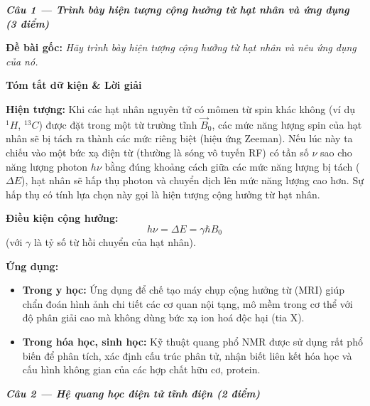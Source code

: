 \documentclass[11pt,a4paper,twocolumn]{article}
\begin{document}

\textbf{\textit{Câu 1 --- Trình bày hiện tượng cộng hưởng từ hạt nhân và ứng dụng (3 điểm)}}

\textbf{Đề bài gốc:} \textit{Hãy trình bày hiện tượng cộng hưởng từ hạt nhân và nêu ứng dụng của nó.}

\textbf{Tóm tắt dữ kiện \& Lời giải}

\textbf{Hiện tượng:} Khi các hạt nhân nguyên tử có mômen từ spin khác không (ví dụ $^1H$, $^{13}C$) được đặt trong một từ trường tĩnh $\vec{B}_0$, các mức năng lượng spin của hạt nhân sẽ bị tách ra thành các mức riêng biệt (hiệu ứng Zeeman). Nếu lúc này ta chiếu vào một bức xạ điện từ (thường là sóng vô tuyến RF) có tần số $\nu$ sao cho năng lượng photon $h\nu$ bằng đúng khoảng cách giữa các mức năng lượng bị tách ($\Delta E$), hạt nhân sẽ hấp thụ photon và chuyển dịch lên mức năng lượng cao hơn. Sự hấp thụ có tính lựa chọn này gọi là hiện tượng cộng hưởng từ hạt nhân.

\textbf{Điều kiện cộng hưởng:} 
\begin{equation*}
    \boxed{h\nu = \Delta E = \gamma \hbar B_0}
\end{equation*}
(với $\gamma$ là tỷ số từ hồi chuyển của hạt nhân).

\textbf{Ứng dụng:}
\begin{itemize}[leftmargin=*, topsep=0pt, itemsep=0pt]
    \item \textbf{Trong y học:} Ứng dụng để chế tạo máy chụp cộng hưởng từ (MRI) giúp chẩn đoán hình ảnh chi tiết các cơ quan nội tạng, mô mềm trong cơ thể với độ phân giải cao mà không dùng bức xạ ion hoá độc hại (tia X).
    \item \textbf{Trong hóa học, sinh học:} Kỹ thuật quang phổ NMR được sử dụng rất phổ biến để phân tích, xác định cấu trúc phân tử, nhận biết liên kết hóa học và cấu hình không gian của các hợp chất hữu cơ, protein.
\end{itemize}

\vspace{0.4cm}
\textbf{\textit{Câu 2 --- Hệ quang học điện tử tĩnh điện (2 điểm)}}
\end{document}

